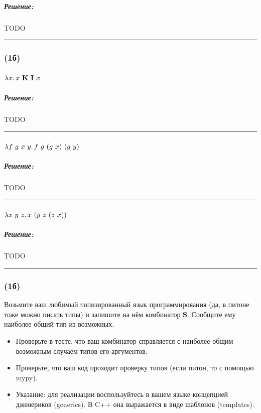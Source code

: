 \documentclass{article}
\newenvironment{proof}{\subparagraph{\hspace{-1em}Решение:\newline}}{\par\noindent\rule{\textwidth}{0.4pt}}
\newcommand{\term}[1]{\mathbf{#1}}
\newcommand{\ap}{~}
\begin{document}
    \begin{proof}
        TODO %
    \end{proof}

    \subsubsection{(1б)}

    \paragraph{} $\lambda x\ldotp x \ap \term{K} \ap \term{I} \ap x$

    \begin{proof}
        TODO %
    \end{proof}

    \paragraph{} $\lambda f~g~x~y\ldotp f \ap g \ap (g \ap x) \ap (g \ap y)$

    \begin{proof}
        TODO %
    \end{proof}

    \paragraph{} $\lambda x~y~z\ldotp x~(y~z~(z~x))$

    \begin{proof}
        TODO %
    \end{proof}

    \subsubsection{(1б)}

    Возьмите ваш любимый типизированный язык программирования (да, в питоне тоже можно писать типы) и запишите на нём комбинатор $\term{S}$.
    Сообщите ему наиболее общий тип из возможных.
    \begin{itemize}
        \item Проверьте в тесте, что ваш комбинатор справляется с наиболее общим возможным случаем типов его аргументов.
        \item Проверьте, что ваш код проходит проверку типов (если питон, то с помощью mypy).
        \item Указание: для реализации воспользуйтесь в вашем языке концепцией дженериков (generics).
        В C++ она выражается в виде шаблонов (templates).
    \end{itemize}
\end{document}
